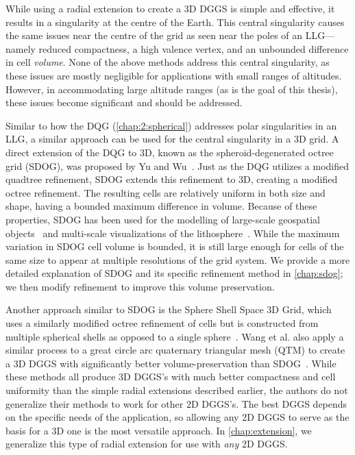 While using a radial extension to create a 3D DGGS is simple and effective, it results in a singularity at the centre of the Earth.
This central singularity causes the same issues near the centre of the grid as seen near the poles of an LLG---namely reduced compactness, a high valence vertex, and an unbounded difference in cell \textit{volume}.
None of the above methods address this central singularity, as these issues are mostly negligible for applications with small ranges of altitudes.
However, in accommodating large altitude ranges (as is the goal of this thesis), these issues become significant and should be addressed.


Similar to how the DQG (\cref{chap:2:spherical}) addresses polar singularities in an LLG, a similar approach can be used for the central singularity in a 3D grid.
A direct extension of the DQG to 3D, known as the spheroid-degenerated octree grid (SDOG), was proposed by Yu and Wu~\cite{yu2009sdog}.
Just as the DQG utilizes a modified quadtree refinement, SDOG extends this refinement to 3D, creating a modified octree refinement.
The resulting cells are relatively uniform in both size and shape, having a bounded maximum difference in volume.
Because of these properties, SDOG has been used for the modelling of large-scale geospatial objects~\cite{yu2012large-scale} and multi-scale visualizations of the lithosphere~\cite{yu2012lithosphere}.
While the maximum variation in SDOG cell volume is bounded, it is still large enough for cells of the same size to appear at multiple resolutions of the grid system.
We provide a more detailed explanation of SDOG and its specific refinement method in \cref{chap:sdog}; we then modify refinement to improve this volume preservation.


Another approach similar to SDOG is the Sphere Shell Space 3D Grid, which uses a similarly modified octree refinement of cells but is constructed from multiple spherical shells as opposed to a single sphere~\cite{gang2013sphere}.
Wang et al. also apply a similar process to a great circle arc quaternary triangular mesh (QTM) to create a 3D DGGS with significantly better volume-preservation than SDOG~\cite{wang2013global}.
While these methods all produce 3D DGGS's with much better compactness and cell uniformity than the simple radial extensions described earlier, the authors do not generalize their methods to work for other 2D DGGS's.
The best DGGS depends on the specific needs of the application, so allowing any 2D DGGS to serve as the basis for a 3D one is the most versatile approach.
In \cref{chap:extension}, we generalize this type of radial extension for use with \textit{any} 2D DGGS.


